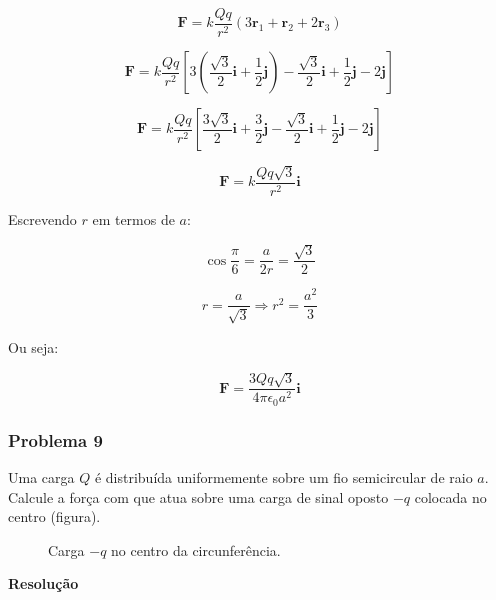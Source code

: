 \documentclass[a4paper, 12pt]{article}
\begin{document}
	\[
	\textbf{F}=k\frac{Qq}{r^2}\left(3\textbf{r}_1+\textbf{r}_2+2\textbf{r}_3\right)
	\]
	
	\[
	\textbf{F}=k\frac{Qq}{r^2}\left[3\left(\frac{\sqrt{3}}{2}\textbf{i}+\frac{1}{2}\textbf{j}\right)-\frac{\sqrt{3}}{2}\textbf{i}+\frac{1}{2}\textbf{j}-2\textbf{j}\right]
	\]
	
	\[
	\textbf{F}=k\frac{Qq}{r^2}\left[\frac{3\sqrt{3}}{2}\textbf{i}+\frac{3}{2}\textbf{j}-\frac{\sqrt{3}}{2}\textbf{i}+\frac{1}{2}\textbf{j}-2\textbf{j}\right]
	\]
	
	\[
	\textbf{F}=k\frac{Qq\sqrt{3}}{r^2}\textbf{i}
	\]
	
	Escrevendo $r$ em termos de $a$:
	
	\[
	\cos\frac{\pi}{6}=\frac{a}{2r}=\frac{\sqrt{3}}{2}
	\]
	
	\[
	r=\frac{a}{\sqrt{3}}\Rightarrow r^2=\frac{a^2}{3}
	\]
	
	Ou seja:
	
	\[
	\textbf{F}=\frac{3Qq\sqrt{3}}{4\pi \epsilon_0a^2}\textbf{i}
	\]
	
	\subsubsection{Problema 9}
	
	Uma carga $Q$ é distribuída uniformemente sobre um fio semicircular de raio $a$. Calcule a força com que atua sobre uma carga de sinal oposto $-q$ colocada no centro (figura).
	
	\begin{figure}[ht]
		\centering
		\caption{Carga $-q$ no centro da circunferência.}
		
	\end{figure}
	
	\textbf{Resolução}
	
\end{document}
